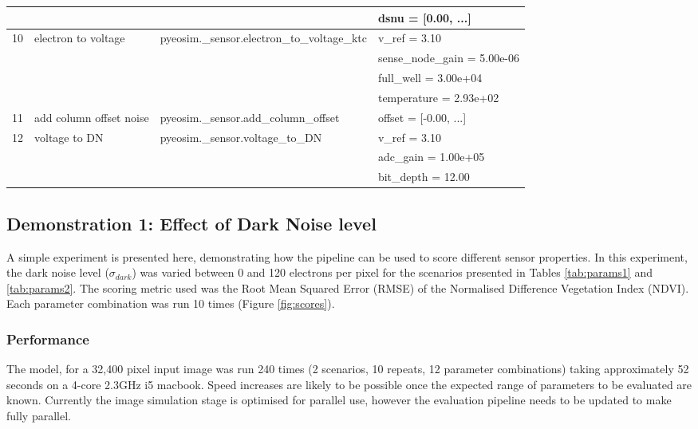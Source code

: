 \documentclass[10pt,a4paper,final,twocolumn]{article}
\begin{document}
\begin{table*}
\begin{tabular}{llll}
 & & & dsnu = [0.00, ...]\\
\midrule
10 & electron to voltage & pyeosim.\_sensor.electron\_to\_voltage\_ktc & v\_ref = 3.10\\
 & & & sense\_node\_gain = 5.00e-06\\
 & & & full\_well = 3.00e+04\\
 & & & temperature = 2.93e+02\\
\midrule
11 & add column offset noise & pyeosim.\_sensor.add\_column\_offset & offset = [-0.00, ...]\\
\midrule
12 & voltage to DN & pyeosim.\_sensor.voltage\_to\_DN & v\_ref = 3.10\\
 & & & adc\_gain = 1.00e+05\\
 & & & bit\_depth = 12.00\\
\midrule
\bottomrule
\end{tabular}

\label{tab:params2}
\end{table*}

\subsection{Demonstration 1: Effect of Dark Noise level}
\begin{figure*}
\centering
\caption{Uncalibrated (red) and calibrated (black) Root Mean Squared Error for low spatial resolution (solid) and high spatial resolution (dashed) scenarios over a range of dark noise levels}
\label{fig:scores}
\end{figure*}

A simple experiment is presented here, demonstrating how the pipeline can be used to score different sensor properties. In this experiment, the dark noise level ($\sigma_{dark}$) was varied between 0 and 120 electrons per pixel for the scenarios presented in Tables \ref{tab:params1} and \ref{tab:params2}. The scoring metric used was the Root Mean Squared Error (RMSE) of the Normalised Difference Vegetation Index (NDVI).  Each parameter combination was run 10 times (Figure \ref{fig:scores}).

\subsubsection{Performance}
The model, for a 32,400 pixel input image was run 240 times (2 scenarios, 10 repeats, 12 parameter combinations) taking approximately 52 seconds on a 4-core 2.3GHz i5 macbook. Speed increases are likely to be possible once the expected range of parameters to be evaluated are known. Currently the image simulation stage is optimised for parallel use, however the evaluation pipeline needs to be updated to make fully parallel.
\end{document}
